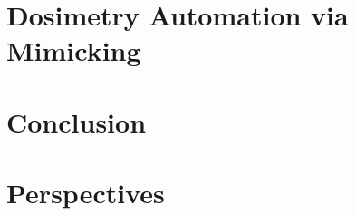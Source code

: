 \documentclass[a4paper,12pt]{book}
\begin{document}
	\chapter{Dosimetry Automation via Mimicking}
	\begin{chapterabstract}
		
	\end{chapterabstract}
	\clearpage
	\localtableofcontents
	
	
	\chapter{Conclusion}
	
	\chapter{Perspectives}
	
	
	
	
\end{document}
